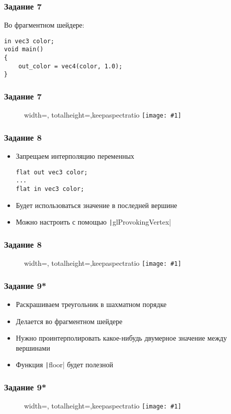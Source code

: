 \documentclass[10pt]{beamer}
\newcommand{\slideimage}[1]{
  \begin{figure}
    \begin{adjustbox}{width=\textwidth, totalheight=\textheight-2\baselineskip-2\baselineskip,keepaspectratio}
      \texttt{[image: \#1]}
    \end{adjustbox}
  \end{figure}
}
\begin{document}
\begin{frame}[fragile]
\frametitle{Задание 7}
Во фрагментном шейдере:
\begin{verbatim}
in vec3 color;
void main()
{
    out_color = vec4(color, 1.0);
}
\end{verbatim}
\end{frame}

\begin{frame}[fragile]
\frametitle{Задание 7}
\slideimage{task_7.png}
\end{frame}

\begin{frame}[fragile]
\frametitle{Задание 8}
\begin{itemize}
\item Запрещаем интерполяцию переменных
\begin{verbatim}
flat out vec3 color;
...
flat in vec3 color;
\end{verbatim}
\item Будет использоваться значение в последней вершине
\item Можно настроить с помощью \texttt|glProvokingVertex|
\end{itemize}
\end{frame}

\begin{frame}[fragile]
\frametitle{Задание 8}
\slideimage{task_8.png}
\end{frame}

\begin{frame}[fragile]
\frametitle{Задание 9*}
\begin{itemize}
\item Раскрашиваем треугольник в шахматном порядке
\item Делается во фрагментном шейдере
\item Нужно проинтерполировать какое-нибудь двумерное значение между вершинами
\item Функция \texttt|floor| будет полезной
\end{itemize}
\end{frame}

\begin{frame}[fragile]
\frametitle{Задание 9*}
\slideimage{task_9.png}
\end{frame}
\end{document}
